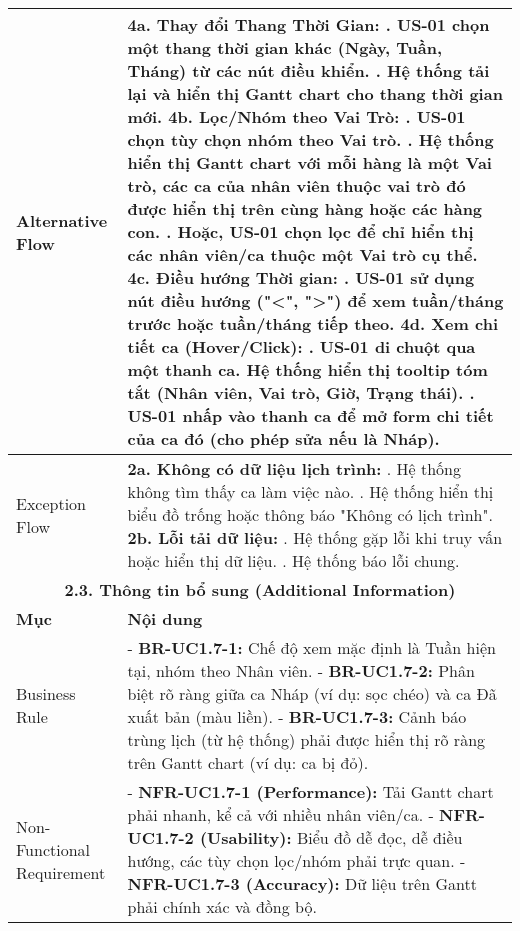 \begin{longtable}{|m{4cm}|p{11cm}|}
\hline
Alternative Flow & \textbf{4a. Thay đổi Thang Thời Gian:} \newline    1. US-01 chọn một thang thời gian khác (Ngày, Tuần, Tháng) từ các nút điều khiển. \newline    2. Hệ thống tải lại và hiển thị Gantt chart cho thang thời gian mới. \newline \textbf{4b. Lọc/Nhóm theo Vai Trò:} \newline    1. US-01 chọn tùy chọn nhóm theo Vai trò. \newline    2. Hệ thống hiển thị Gantt chart với mỗi hàng là một Vai trò, các ca của nhân viên thuộc vai trò đó được hiển thị trên cùng hàng hoặc các hàng con. \newline    3. Hoặc, US-01 chọn lọc để chỉ hiển thị các nhân viên/ca thuộc một Vai trò cụ thể. \newline \textbf{4c. Điều hướng Thời gian:} \newline    1. US-01 sử dụng nút điều hướng ("<", ">") để xem tuần/tháng trước hoặc tuần/tháng tiếp theo. \newline \textbf{4d. Xem chi tiết ca (Hover/Click):} \newline    1. US-01 di chuột qua một thanh ca. Hệ thống hiển thị tooltip tóm tắt (Nhân viên, Vai trò, Giờ, Trạng thái). \newline    2. US-01 nhấp vào thanh ca để mở form chi tiết của ca đó (cho phép sửa nếu là Nháp). \\
\hline
Exception Flow & \textbf{2a. Không có dữ liệu lịch trình:} \newline    1. Hệ thống không tìm thấy ca làm việc nào. \newline    2. Hệ thống hiển thị biểu đồ trống hoặc thông báo "Không có lịch trình". \newline \textbf{2b. Lỗi tải dữ liệu:} \newline    1. Hệ thống gặp lỗi khi truy vấn hoặc hiển thị dữ liệu. \newline    2. Hệ thống báo lỗi chung. \\
\hline
\multicolumn{2}{|c|}{\textbf{2.3. Thông tin bổ sung (Additional Information)}} \\
\hline
\textbf{Mục} & \textbf{Nội dung} \\
\hline
Business Rule & - \textbf{BR-UC1.7-1:} Chế độ xem mặc định là Tuần hiện tại, nhóm theo Nhân viên. \newline - \textbf{BR-UC1.7-2:} Phân biệt rõ ràng giữa ca Nháp (ví dụ: sọc chéo) và ca Đã xuất bản (màu liền). \newline - \textbf{BR-UC1.7-3:} Cảnh báo trùng lịch (từ hệ thống) phải được hiển thị rõ ràng trên Gantt chart (ví dụ: ca bị đỏ). \\
\hline
Non-Functional Requirement & - \textbf{NFR-UC1.7-1 (Performance):} Tải Gantt chart phải nhanh, kể cả với nhiều nhân viên/ca. \newline - \textbf{NFR-UC1.7-2 (Usability):} Biểu đồ dễ đọc, dễ điều hướng, các tùy chọn lọc/nhóm phải trực quan. \newline - \textbf{NFR-UC1.7-3 (Accuracy):} Dữ liệu trên Gantt phải chính xác và đồng bộ. \\
\hline
\end{longtable}

